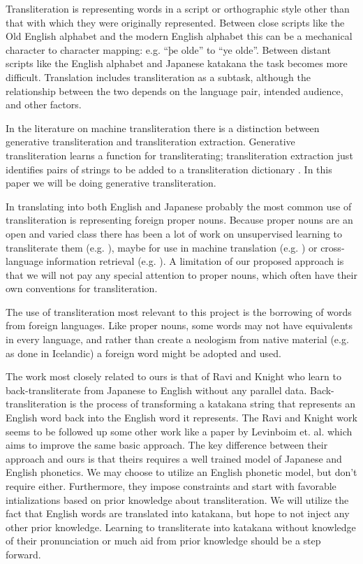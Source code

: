 \documentclass{article}
\begin{document}
Transliteration is representing words
in a script or orthographic style
other than that with which they were originally represented.
Between close scripts like the Old English alphabet and the modern English alphabet
this can be a mechanical character to character mapping:
e.g. ``þe olde'' to ``ye olde''.
Between distant scripts
like the English alphabet and Japanese katakana
the task becomes more difficult.
Translation includes transliteration as a subtask,
although the relationship between the two
depends on the language pair, intended audience, and other factors.

In the literature on machine transliteration there is a distinction
between generative transliteration and transliteration extraction.
Generative transliteration learns a function for transliterating;
transliteration extraction just identifies pairs of strings
to be added to a transliteration dictionary
\cite{Karimi:2011:MTS:1922649.1922654}.
In this paper we will be doing generative transliteration.

In translating into both English and Japanese
probably the most common use of transliteration
is representing foreign proper nouns.
Because proper nouns are an open and varied class
there has been a lot of work on unsupervised learning to transliterate them
(e.g. \cite{Tao2006UnsupervisedNE}),
maybe for use in machine translation (e.g. \cite{Durrani2014IntegratingAU})
or cross-language information retrieval (e.g. \cite{10.1007/978-3-642-40087-2_29}).
A limitation of our proposed approach
is that we will not pay any special attention to proper nouns,
which often have their own conventions for transliteration.

The use of transliteration most relevant to this project
is the borrowing of words from foreign languages.
Like proper nouns,
some words may not have equivalents in every language,
and rather than create a neologism from native material (e.g. as done in Icelandic)
a foreign word might be adopted and used.

The work most closely related to ours is that of Ravi and Knight
\cite{Ravi2009LearningPM}
who learn to back-transliterate from Japanese to English
without any parallel data.
Back-transliteration is the process of
transforming a katakana string that represents an English word
back into the English word it represents.
The Ravi and Knight work seems to be followed up some other work
like a paper by Levinboim et. al. \cite{Levinboim2015ModelIR}
which aims to improve the same basic approach.
The key difference between their approach and ours
is that theirs requires a well trained model of Japanese and English phonetics.
We may choose to utilize an English phonetic model,
but don't require either.
Furthermore,
they impose constraints and start with favorable intializations
based on prior knowledge about transliteration.
We will utilize the fact
that English words are translated into katakana,
but hope to not inject any other prior knowledge.
Learning to transliterate into katakana
without knowledge of their pronunciation
or much aid from prior knowledge should be a step forward.
\end{document}
